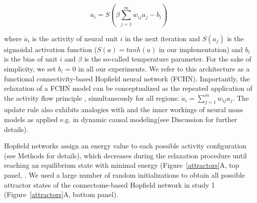 \documentclass{article}
\begin{document}
\begin{equation}
\label{hopfield-update}
\dot{a}_i = S(\beta \sum_{j=1}^m w_{ij}a_j - b_i)
\end{equation}

where $\dot{a}_i$ is the activity of neural unit $i$ in the next iteration and $S(a_j)$ is the sigmoidal activation
function ($S(a) = tanh(a)$ in our implementation) and $b_i$ is the bias of unit $i$ and $\beta$ is the so-called temperature parameter. For the sake of simplicity, we set $b_i=0$ in all our experiments. We refer to this architecture as a functional connectivity-based Hopfield neural network (FCHN). Importantly, the relaxation of a FCHN model can be conceptualized as the repeated
application of the activity flow principle \citep{cole2016activity, ito2017cognitive} , simultaneously for all
regions: $\dot{a}_i = \sum_{j=1}^m w_{ij}a_j$. The update rule also exhibits analogies with  \citep{gu2015controllability} and the inner workings of neural mass models \citep{breakspear2017dynamic} as applied e.g. in dynamic causal modeling(see Discussion for further details).

Hopfield networks assign an energy value to each possible activity configuration (see Methods for details), which decreases during the relaxation procedure until reaching an equilibrium state with minimal energy (Figure~\ref{attractors}A, top panel,
\citep{hopfield1982neural, koiran1994dynamics}.
We used a large number of random initializations to obtain all possible attractor states of the connectome-based
Hopfield network in study 1 (Figure~\ref{attractors}A, bottom panel).
\end{document}
